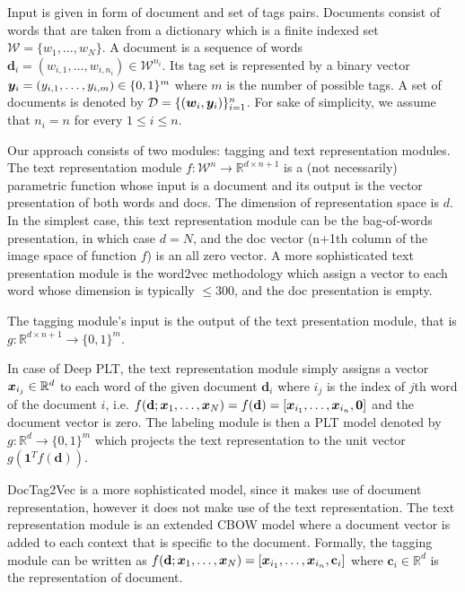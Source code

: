 \documentclass{article}
\newcommand{\cD}{\mathcal{D}}
\newcommand{\bd}{\mathbf{d}}
\newcommand{\bc}{\mathbf{c}}
\newcommand{\calW}{\mathcal{W}}
\newcommand\R{\mathbb{R}}   %
\begin{document}
Input is given in form of document and set of tags pairs. Documents consist of words that are taken from a dictionary which is a finite indexed set $\calW = \{ w_1, \dots , w_N \}$. A document is a sequence of words  $\bd_i = (w_{i,1}, \dots, w_{i,n_i})\in \calW^{n_i}$. Its tag set is represented  by a binary vector $\boldsymbol{y}_i = (y_{i,1}, \ldots, y_{i,m}) \in \{ 0 , 1 \}^m$ where $m$ is the number of possible tags. A set of documents is denoted by $\cD = \{ (\bw_i, \by_{i}) \}_{i=1}^n$. For sake of simplicity, we assume that $n_i = n$ for every $1\le i \le n$.

Our approach consists of two modules: tagging and text representation modules. The text representation module $f : \calW^{n} \rightarrow \R^{d \times n+1}$ is a (not necessarily) parametric function whose input is a document and its output is the vector presentation of both words and docs. The dimension of representation space is $d$. In the simplest case, this text representation module can be the bag-of-words presentation, in which case $d=N$, and the doc vector (n+1\/th column of the image space of function $f$) is an all zero vector. A more sophisticated text presentation module is the word2vec methodology which assign a vector to each word whose dimension is typically $\le300$, and the doc presentation is empty. 

The tagging module's input is the output of the text presentation module, that is $g: \R^{d \times n+1} \rightarrow  \{ 0 , 1 \}^m$. 

In case of Deep PLT, the text representation module simply assigns a vector $\bx_{i_j} \in \R^d$ to each word of the given document $\bd_i$ where $i_j$ is the index of $j$\/th word of the document $i$, i.e. $f(\bd; \bx_1, \dots, \bx_N) = f(\bd) = \left[\bx_{i_1}, \dots , \bx_{i_n}, \mathbf{0}\right]$ and the document vector is zero. The labeling module is then a PLT model denoted by $g : \R^d \rightarrow  \{ 0 , 1 \}^m$ which projects the text representation to the unit vector $g( \mathbf{1}^T  f(\bd))$.


DocTag2Vec is a more sophisticated model, since it makes use of document representation, however it does not make use of the text representation. The text representation module is an extended CBOW model where a document vector is added to each context that is specific to the document. Formally, the tagging module can be written as $f(\bd; \bx_1, \dots, \bx_N)=\left[\bx_{i_1}, \dots , \bx_{i_n}, \bc_i \right]$ where $\bc_i \in \R ^d$ is the representation of document. 
\end{document}

